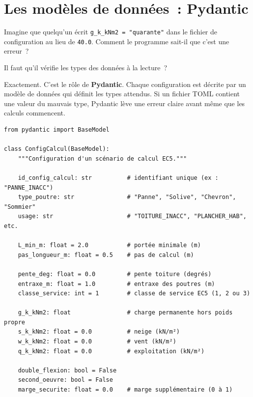 \documentclass[12pt, a4paper, openany]{book}
\newcommand{\py}[1]{\texttt{#1}}
\newcommand{\fichier}[1]{\texttt{\textit{#1}}}
\begin{document}
\section{Les mod\`eles de donn\'ees~: Pydantic}

\begin{maitre}
Imagine que quelqu'un \'ecrit \py{g\_k\_kNm2 = "quarante"} dans le fichier
de configuration au lieu de \py{40.0}. Comment le programme sait-il que
c'est une erreur~?
\end{maitre}

\begin{apprenti}
Il faut qu'il v\'erifie les types des donn\'ees \`a la lecture~?
\end{apprenti}

\begin{maitre}
Exactement. C'est le r\^ole de \textbf{Pydantic}. Chaque configuration
est d\'ecrite par un mod\`ele de donn\'ees qui d\'efinit les types
attendus. Si un fichier TOML contient une valeur du mauvais type,
Pydantic l\`eve une erreur claire avant m\^eme que les calculs commencent.
\end{maitre}

\begin{lstlisting}[style=python, caption={\fichier{modeles/config\_calcul.py} --- modèle Pydantic (simplifié)}]
from pydantic import BaseModel

class ConfigCalcul(BaseModel):
    """Configuration d'un scénario de calcul EC5."""

    id_config_calcul: str          # identifiant unique (ex : "PANNE_INACC")
    type_poutre: str               # "Panne", "Solive", "Chevron", "Sommier"
    usage: str                     # "TOITURE_INACC", "PLANCHER_HAB", etc.

    L_min_m: float = 2.0           # portée minimale (m)
    pas_longueur_m: float = 0.5    # pas de calcul (m)

    pente_deg: float = 0.0         # pente toiture (degrés)
    entraxe_m: float = 1.0         # entraxe des poutres (m)
    classe_service: int = 1        # classe de service EC5 (1, 2 ou 3)

    g_k_kNm2: float                # charge permanente hors poids propre
    s_k_kNm2: float = 0.0          # neige (kN/m²)
    w_k_kNm2: float = 0.0          # vent (kN/m²)
    q_k_kNm2: float = 0.0          # exploitation (kN/m²)

    double_flexion: bool = False
    second_oeuvre: bool = False
    marge_securite: float = 0.0    # marge supplémentaire (0 à 1)
\end{lstlisting}
\end{document}
